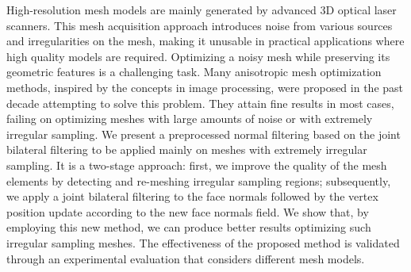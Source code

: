 High-resolution mesh models are mainly generated by advanced 3D optical laser scanners. This mesh acquisition approach introduces noise from various sources and irregularities on the mesh, making it unusable in practical applications where high quality models are required. Optimizing a noisy mesh while preserving its geometric features is a challenging task. Many anisotropic mesh optimization methods, inspired by the concepts in image processing, were proposed in the past decade attempting to solve this problem. They attain fine results in most cases, failing on optimizing meshes with large amounts of noise or with extremely irregular sampling. We present a preprocessed normal filtering based on the joint bilateral filtering to be applied mainly on meshes with extremely irregular sampling. It is a two-stage approach: first, we improve the quality of the mesh elements by detecting and re-meshing irregular sampling regions; subsequently, we apply a joint bilateral filtering to the face normals followed by the vertex position update according to the new face normals field. We show that, by employing this new method, we can produce better results optimizing such irregular sampling meshes. The effectiveness of the proposed method is validated through an experimental evaluation that considers different mesh models.

